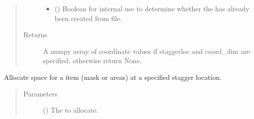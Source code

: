 \documentclass[letterpaper,10pt,english]{sphinxmanual}
\begin{document}
\begin{fulllineitems}
\begin{fulllineitems}
\begin{quote}
\begin{description}
\begin{itemize}
\item {} 
 () \textendash{} Boolean for internal use to determine whether the
{\hyperref[\detokenize{grid:ESMF.api.grid.Grid}]{}} has already been created from file.

\end{itemize}

\item[{Returns}] \leavevmode
A numpy array of coordinate values if staggerloc and
coord\_dim are specified, otherwise return None.

\end{description}\end{quote}

\end{fulllineitems}


\begin{fulllineitems}
\label{\detokenize{grid:ESMF.api.grid.Grid.add_item}}
Allocate space for a {\hyperref[\detokenize{grid:ESMF.api.grid.Grid}]{}} item (mask or areas)
at a specified stagger location.

\begin{quote}\begin{description}
\item[{Parameters}] \leavevmode
{} ({\hyperref[\detokenize{GridItem:ESMF.api.constants.GridItem}]{}}) \textendash{} The {\hyperref[\detokenize{GridItem:ESMF.api.constants.GridItem}]{}} to
allocate.

\end{description}\end{quote}


\end{fulllineitems}
\end{fulllineitems}
\end{document}
